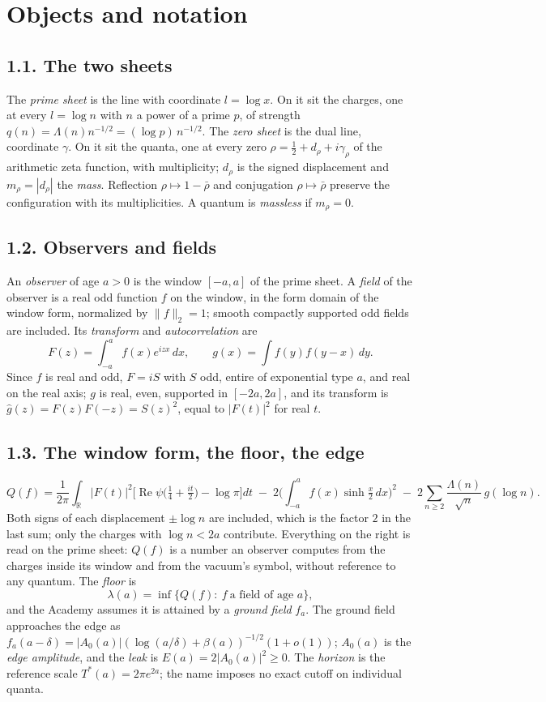 \documentclass[11pt]{article}
\theoremstyle{definition}
\theoremstyle{remark}
\newcommand{\Tst}{T^{*}}
\newcommand{\Ree}{\operatorname{Re}}
\begin{document}
\section{Objects and notation}

\subsection*{1.1. The two sheets}
The \emph{prime sheet} is the line with coordinate $l=\log x$. On it sit the charges, one at every $l=\log n$ with $n$ a power of a prime $p$, of strength $q(n)=\Lambda(n)n^{-1/2}=(\log p)\,n^{-1/2}$. The \emph{zero sheet} is the dual line, coordinate $\gamma$. On it sit the quanta, one at every zero $\rho=\tfrac12+d_\rho+i\gamma_\rho$ of the arithmetic zeta function, with multiplicity; $d_\rho$ is the signed displacement and $m_\rho=|d_\rho|$ the \emph{mass}. Reflection $\rho\mapsto1-\bar\rho$ and conjugation $\rho\mapsto\bar\rho$ preserve the configuration with its multiplicities. A quantum is \emph{massless} if $m_\rho=0$.

\subsection*{1.2. Observers and fields}
An \emph{observer} of age $a>0$ is the window $[-a,a]$ of the prime sheet. A \emph{field} of the observer is a real odd function $f$ on the window, in the form domain of the window form, normalized by $\|f\|_2=1$; smooth compactly supported odd fields are included. Its \emph{transform} and \emph{autocorrelation} are
\[
F(z)=\int_{-a}^{a}f(x)e^{izx}\,dx,\qquad g(x)=\int f(y)f(y-x)\,dy .
\]
Since $f$ is real and odd, $F=iS$ with $S$ odd, entire of exponential type $a$, and real on the real axis; $g$ is real, even, supported in $[-2a,2a]$, and its transform is $\hat g(z)=F(z)F(-z)=S(z)^2$, equal to $|F(t)|^2$ for real $t$.

\subsection*{1.3. The window form, the floor, the edge}
\[
Q(f)=\frac1{2\pi}\int_{\mathbb R}|F(t)|^2\Big[\Ree\psi\big(\tfrac14+\tfrac{it}2\big)-\log\pi\Big]dt\;-\;2\Big(\int_{-a}^af(x)\sinh\tfrac x2\,dx\Big)^2\;-\;2\sum_{n\ge2}\frac{\Lambda(n)}{\sqrt n}\,g(\log n).
\]
Both signs of each displacement $\pm\log n$ are included, which is the factor $2$ in the last sum; only the charges with $\log n<2a$ contribute. Everything on the right is read on the prime sheet: $Q(f)$ is a number an observer computes from the charges inside its window and from the vacuum's symbol, without reference to any quantum. The \emph{floor} is
\[
\lambda(a)=\inf\{Q(f):\ f\ \text{a field of age }a\},
\]
and the Academy assumes it is attained by a \emph{ground field} $f_a$. The ground field approaches the edge as $f_a(a-\delta)=|A_0(a)|(\log(a/\delta)+\beta(a))^{-1/2}(1+o(1))$; $A_0(a)$ is the \emph{edge amplitude}, and the \emph{leak} is $E(a)=2|A_0(a)|^2\ge0$. The \emph{horizon} is the reference scale $\Tst(a)=2\pi e^{2a}$; the name imposes no exact cutoff on individual quanta.
\end{document}
